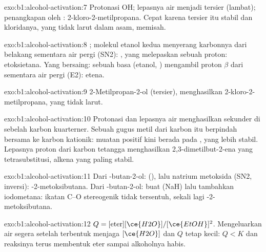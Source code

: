 \begin{solution}{exo:b1:alcohol-activation:7}
Protonasi OH; lepasnya air menjadi  tersier (lambat);
penangkapan oleh : 2-kloro-2-metilpropana. Cepat karena
 tersier itu stabil dan kloridanya, yang tidak larut dalam
asam, memisah.
\end{solution}

\begin{solution}{exo:b1:alcohol-activation:8}
; molekul etanol kedua menyerang karbonnya
dari belakang sementara air pergi (SN2): , yang
melepaskan sebuah proton: etoksietana. Yang bersaing: sebuah basa (etanol,
) mengambil proton $\beta$ dari  sementara air
pergi (E2): etena.
\end{solution}

\begin{solution}{exo:b1:alcohol-activation:9}
2-Metilpropan-2-ol (tersier), menghasilkan 2-kloro-2-metilpropana, yang tidak larut.
\end{solution}

\begin{solution}{exo:b1:alcohol-activation:10}
Protonasi dan lepasnya air menghasilkan  sekunder di sebelah
karbon kuarterner. Sebuah gugus metil dari karbon itu berpindah bersama
 ke karbon kationik: muatan positif kini berada pada
, yang lebih stabil. Lepasnya proton dari karbon tetangga
menghasilkan 2,3-dimetilbut-2-ena yang tetrasubstitusi, alkena yang
paling stabil.
\end{solution}

\begin{solution}{exo:b1:alcohol-activation:11}
Dari -butan-2-ol:  (), lalu natrium metoksida (SN2,
inversi): -2-metoksibutana. Dari -butan-2-ol: buat
 (NaH) lalu tambahkan iodometana: ikatan C--O stereogenik
tidak tersentuh, sekali lagi -2-metoksibutana.
\end{solution}

\begin{solution}{exo:b1:alcohol-activation:12}
$Q = [\text{eter}][\ce{H2O}]/[\ce{EtOH}]^2$. Mengeluarkan air segera
setelah terbentuk menjaga $[\ce{H2O}]$ dan $Q$ tetap kecil: $Q < K$ dan
reaksinya terus membentuk eter sampai alkoholnya habis.
\end{solution}

